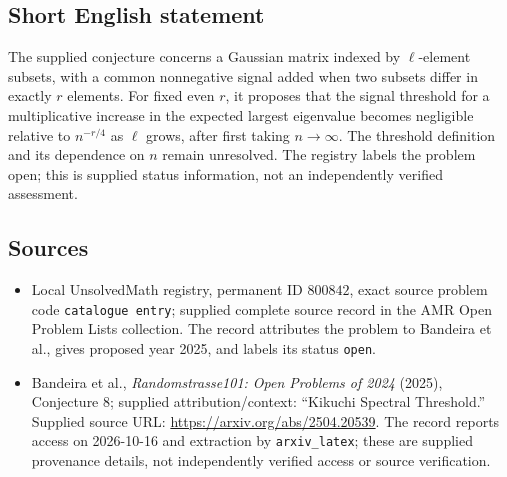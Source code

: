 \documentclass[11pt]{article}
\begin{document}
\subsection{Short English statement}
The supplied conjecture concerns a Gaussian matrix indexed by \(\ell\)-element subsets, with a common nonnegative signal added when two subsets differ in exactly \(r\) elements. For fixed even \(r\), it proposes that the signal threshold for a multiplicative increase in the expected largest eigenvalue becomes negligible relative to \(n^{-r/4}\) as \(\ell\) grows, after first taking \(n\to\infty\). The threshold definition and its dependence on \(n\) remain unresolved. The registry labels the problem open; this is supplied status information, not an independently verified assessment.
\subsection{Sources}
\begin{itemize}
\item Local UnsolvedMath registry, permanent ID \(800842\), exact source problem code \texttt{catalogue entry}; supplied complete source record in the AMR Open Problem Lists collection. The record attributes the problem to Bandeira et al., gives proposed year 2025, and labels its status \texttt{open}.
\item Bandeira et al., \emph{Randomstrasse101: Open Problems of 2024} (2025), Conjecture 8; supplied attribution/context: ``Kikuchi Spectral Threshold.'' Supplied source URL: \url{https://arxiv.org/abs/2504.20539}. The record reports access on 2026-10-16 and extraction by \texttt{arxiv\_latex}; these are supplied provenance details, not independently verified access or source verification.
\end{itemize}
\end{document}
